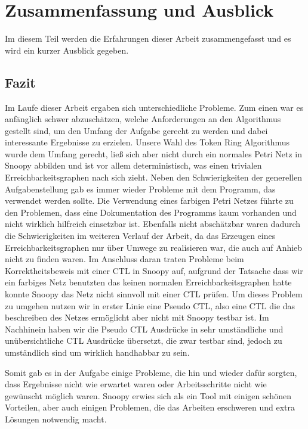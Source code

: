 \section{Zusammenfassung und Ausblick} 
Im diesem Teil werden die Erfahrungen dieser Arbeit zusammengefasst und es wird ein kurzer Ausblick gegeben.

\subsection{Fazit}
Im Laufe dieser Arbeit ergaben sich unterschiedliche Probleme. Zum einen war es anfänglich schwer abzuschätzen, welche Anforderungen an den Algorithmus gestellt sind, um den Umfang der Aufgabe gerecht zu werden und dabei interessante Ergebnisse zu erzielen. Unsere Wahl des Token Ring Algorithmus wurde dem Umfang gerecht, ließ sich aber nicht durch ein normales Petri Netz in Snoopy abbilden und ist vor allem deterministisch, was einen trivialen Erreichbarkeitsgraphen nach sich zieht. Neben den Schwierigkeiten der generellen Aufgabenstellung gab es immer wieder Probleme mit dem Programm, das verwendet werden sollte. Die Verwendung eines farbigen Petri Netzes führte zu den Problemen, dass eine Dokumentation des Programms kaum vorhanden und nicht wirklich hilfreich einsetzbar ist. Ebenfalls nicht abschätzbar waren dadurch die Schwierigkeiten im weiteren Verlauf der Arbeit, da das Erzeugen eines Erreichbarkeitsgraphen nur über Umwege zu realisieren war, die auch auf Anhieb nicht zu finden waren. Im Anschluss daran traten Probleme beim Korrektheitsbeweis mit einer CTL in Snoopy auf, aufgrund der Tatsache dass wir ein farbiges Netz benutzten das keinen normalen Erreichbarkeitsgraphen hatte konnte Snoopy das Netz nicht sinnvoll mit einer CTL prüfen. Um dieses Problem zu umgehen nutzen wir in erster Linie eine Pseudo CTL, also eine CTL die das beschreiben des Netzes ermöglicht aber nicht mit Snoopy testbar ist. Im Nachhinein haben wir die Pseudo CTL Ausdrücke in sehr umständliche und unübersichtliche CTL Ausdrücke übersetzt, die zwar testbar sind, jedoch zu umständlich sind um wirklich handhabbar zu sein.

Somit gab es in der Aufgabe einige Probleme, die hin und wieder dafür sorgten, dass Ergebnisse nicht wie erwartet waren oder Arbeitsschritte nicht wie gewünscht möglich waren. Snoopy erwies sich als ein Tool mit einigen schönen Vorteilen, aber auch einigen Problemen, die das Arbeiten erschweren und extra Lösungen notwendig macht.

